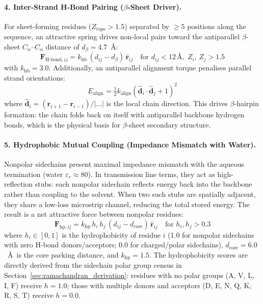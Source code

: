\paragraph{4. Inter-Strand H-Bond Pairing ($\beta$-Sheet Driver).}
For sheet-forming residues ($Z_{topo} > 1.5$) separated by $\geq 5$ positions along the sequence, an attractive spring drives non-local pairs toward the antiparallel $\beta$-sheet $C_\alpha$--$C_\alpha$ distance of $d_\beta = 4.7$~\AA:
\begin{equation}
    \mathbf{F}_{\text{H-bond},ij} = k_{\text{hb}} \, (d_{ij} - d_\beta) \, \hat{\mathbf{r}}_{ij} \quad \text{for } d_{ij} < 12\,\text{\AA},\; Z_i,\, Z_j > 1.5
    \label{eq:hbond_pairing}
\end{equation}
with $k_{\text{hb}} = 3.0$. Additionally, an antiparallel alignment torque penalises parallel strand orientations:
\begin{equation}
    E_{\text{align}} = \tfrac{1}{2} k_{\text{align}} \left( \hat{\mathbf{d}}_i \cdot \hat{\mathbf{d}}_j + 1 \right)^2
    \label{eq:antiparallel}
\end{equation}
where $\hat{\mathbf{d}}_i = (\mathbf{r}_{i+1} - \mathbf{r}_{i-1})/|\ldots|$ is the local chain direction. This drives $\beta$-hairpin formation: the chain folds back on itself with antiparallel backbone hydrogen bonds, which is the physical basis for $\beta$-sheet secondary structure.

\paragraph{5. Hydrophobic Mutual Coupling (Impedance Mismatch with Water).}
Nonpolar sidechains present maximal impedance mismatch with the aqueous termination (water $\varepsilon_r \approx 80$). In transmission line terms, they act as high-reflection stubs: each nonpolar sidechain reflects energy back into the backbone rather than coupling to the solvent. When two such stubs are spatially adjacent, they share a low-loss microstrip channel, reducing the total stored energy. The result is a net attractive force between nonpolar residues:
\begin{equation}
    \mathbf{F}_{\text{hp},ij} = k_{\text{hp}} \, h_i \, h_j \, (d_{ij} - d_{\text{core}}) \, \hat{\mathbf{r}}_{ij} \quad \text{for } h_i, h_j > 0.3
    \label{eq:hydrophobic}
\end{equation}
where $h_i \in [0, 1]$ is the hydrophobicity of residue $i$ (1.0 for nonpolar sidechains with zero H-bond donors/acceptors; 0.0 for charged/polar sidechains), $d_{\text{core}} = 6.0$~\AA\ is the core packing distance, and $k_{\text{hp}} = 1.5$. The hydrophobicity scores are directly derived from the sidechain polar group census in Section~\ref{sec:ramachandran_derivation}: residues with no polar groups (A, V, L, I, F) receive $h = 1.0$; those with multiple donors and acceptors (D, E, N, Q, K, R, S, T) receive $h = 0.0$.

